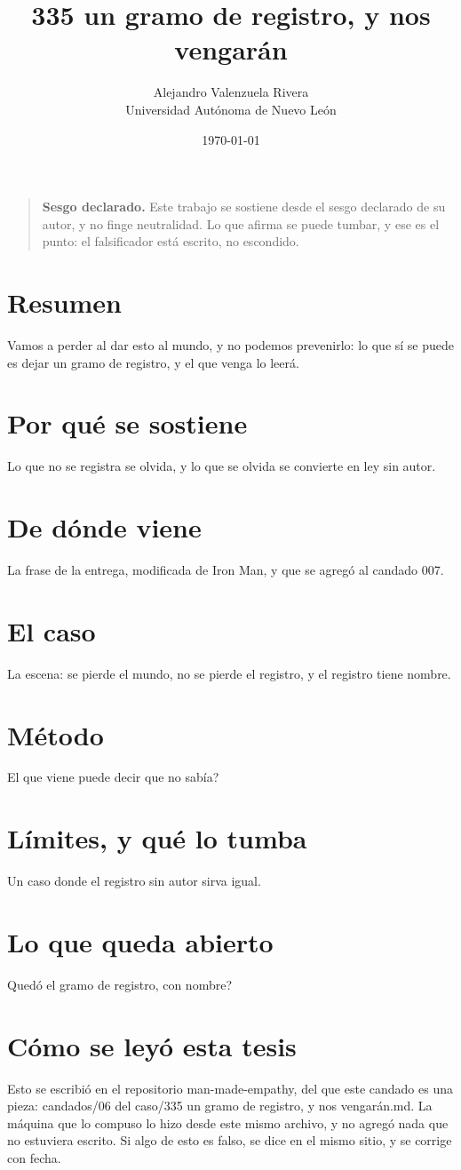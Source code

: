 \documentclass[11pt,a4paper]{article}
\title{335 un gramo de registro, y nos vengarán}
\author{Alejandro Valenzuela Rivera\\\small Universidad Autónoma de Nuevo León}
\date{\today}
\begin{document}
\maketitle

\begin{quote}
\textbf{Sesgo declarado.} Este trabajo se sostiene desde el sesgo declarado de su autor, y no finge neutralidad. Lo que afirma se puede tumbar, y ese es el punto: el falsificador está escrito, no escondido.
\end{quote}

\section*{Resumen}
Vamos a perder al dar esto al mundo, y no podemos prevenirlo: lo que sí se puede es dejar un gramo de registro, y el que venga lo leerá.

\section{Por qué se sostiene}
Lo que no se registra se olvida, y lo que se olvida se convierte en ley sin autor.

\section{De dónde viene}
La frase de la entrega, modificada de Iron Man, y que se agregó al candado 007.

\section{El caso}
La escena: se pierde el mundo, no se pierde el registro, y el registro tiene nombre.

\section{Método}
\textquestiondown{}El que viene puede decir que no sabía?

\section{Límites, y qué lo tumba}
Un caso donde el registro sin autor sirva igual.

\section{Lo que queda abierto}
\textquestiondown{}Quedó el gramo de registro, con nombre?

\section*{Cómo se leyó esta tesis}
Esto se escribió en el repositorio man-made-empathy, del que este candado es una pieza: candados/06 del caso/335 un gramo de registro, y nos vengarán.md. La máquina que lo compuso lo hizo desde este mismo archivo, y no agregó nada que no estuviera escrito. Si algo de esto es falso, se dice en el mismo sitio, y se corrige con fecha.
\end{document}
